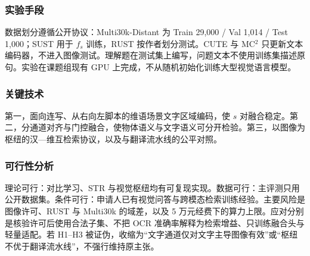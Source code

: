 \subsubsection{实验手段}

数据划分遵循公开协议：Multi30k-Distant 为 Train 29{,}000 / Val 1{,}014 / Test 1{,}000\cite{tayir2024visual,elliott2016multi30k}；SUST 用于 $f_s$ 训练，RUST 按作者划分测试\cite{kong2023sust}。CUTE 与 MC$^2$ 只更新文本编码器，不进入图像测试\cite{zhuang2025cute,zhang2024mc2}。理解题在测试集上编写，问题文本不使用训练集描述原句。实验在课题组现有 GPU 上完成，不从随机初始化训练大型视觉语言模型。

\subsubsection{关键技术}

第一，面向连写、从右向左脚本的维语场景文字区域编码，使 $s$ 对融合稳定。第二，分通道对齐与门控融合，使物体语义与文字语义可分开检验。第三，以图像为枢纽的汉—维互检索协议，以及与翻译流水线的公平对照。

\subsubsection{可行性分析}

理论可行：对比学习、STR 与视觉枢纽均有可复现实现\cite{radford2021learning,fang2021read,huang2020unsupervised}。数据可行：主评测只用公开数据集。条件可行：申请人已有视觉问答与跨模态检索训练经验\cite{yan2024knowledge,xu2026rshr}。主要风险是图像许可、RUST 与 Multi30k 的域差，以及 5 万元经费下的算力上限。应对分别是核验许可后使用合法子集、不把 OCR 准确率解释为检索增益、只训练融合头与轻量适配。若 H1--H3 被证伪，收缩为“文字通道仅对文字主导图像有效”或“枢纽不优于翻译流水线”，不强行维持原主张。
